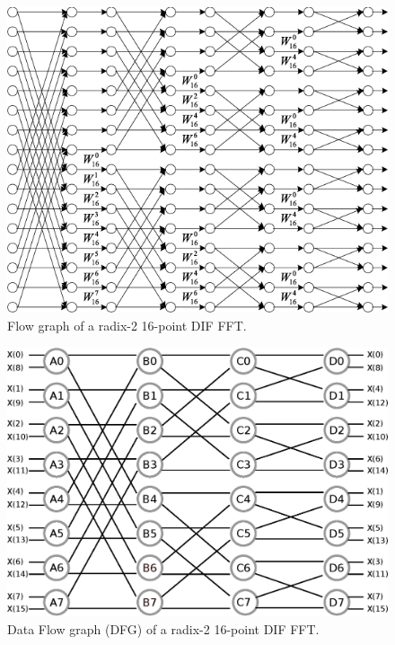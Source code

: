 \documentclass[journal,comsoc]{IEEEtran}
\begin{document}
\begin{figure}[htbp]
\centering
\includegraphics[width=\linewidth]{Diagramas/fft16.png}%
\caption{Flow graph of a radix-2 16-point DIF FFT.}
\label{fig:flowgraph_16}
\end{figure}

\begin{figure}[htbp]%
\centering
\includegraphics[width=\linewidth]{Diagramas/Butter16.eps}
\caption{Data Flow graph (DFG) of a radix-2 16-point DIF FFT.}
\label{fig:dfg_16}
\end{figure}
\end{document}
